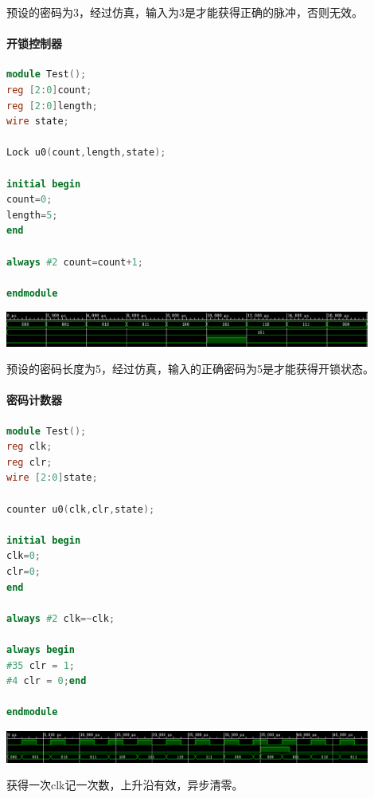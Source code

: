 \documentclass[a4paper,11pt]{ctexart}
\begin{document}
预设的密码为3，经过仿真，输入为3是才能获得正确的脉冲，否则无效。
\paragraph{开锁控制器}
\begin{lstlisting}[language={verilog}]
module Test();
reg [2:0]count;
reg [2:0]length;
wire state;

Lock u0(count,length,state);

initial begin
count=0;
length=5;
end

always #2 count=count+1;

endmodule
\end{lstlisting}
\includegraphics[width=0.9\textwidth]{./images/sim2.eps}

预设的密码长度为5，经过仿真，输入的正确密码为5是才能获得开锁状态。

\paragraph{密码计数器}
\begin{lstlisting}[language={verilog}]
module Test();
reg clk;
reg clr;
wire [2:0]state;

counter u0(clk,clr,state);

initial begin
clk=0;
clr=0;
end

always #2 clk=~clk;

always begin
#35 clr = 1;
#4 clr = 0;end

endmodule
\end{lstlisting}
\includegraphics[width=0.9\textwidth]{./images/sim3.eps}

获得一次clk记一次数，上升沿有效，异步清零。
\end{document}
